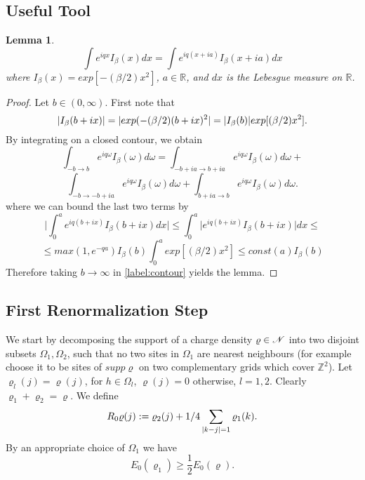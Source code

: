 \documentclass[11pt,reqno]{article}
\DeclarePairedDelimiter\abs{\lvert}{\rvert}%
\newtheorem{lemma}[thm]{Lemma}
\theoremstyle{definition}
\numberwithin{equation}{section}
\begin{document}
\subsection{Useful Tool}
\begin{lemma} \label{lemma:contour}
\begin{equation}
\int e^{i q x} I_\beta(x)dx = \int e^{i q (x+ia)} I_\beta(x+ia)dx
\end{equation}
where $I_\beta(x) = exp[-(\beta/2)x^2]$, $a\in \mathbb{R}$, and $dx$ is the Lebesgue measure on $\mathbb{R}$.
\end{lemma}
\begin{proof}
Let $b \in (0,\infty)$. First note that 
$$
\abs{I_\beta(b+ix)} = \abs{exp(-(\beta/2) (b+ix)^2} = \abs{I_\beta(b)}exp[(\beta/2)x^2].
$$
By integrating on a closed contour, we obtain
$$
\int_{-b \rightarrow b} e^{i q \omega} I_\beta(\omega)d\omega =
\int_{-b+ia \rightarrow b+ia} e^{i q \omega} I_\beta(\omega)d\omega + 
$$
\begin{equation} \label{label:contour}
\int_{-b \rightarrow -b+ia} e^{i q \omega} I_\beta(\omega)d\omega +
\int_{b+ia \rightarrow b} e^{i q \omega} I_\beta(\omega)d\omega.
\end{equation}
where we can bound the last two terms by
$$
\Bigg| \int_0^a e^{iq(b+ix)}I_\beta(b+ix)dx \Bigg| \leq 
\int_0^a \Big| e^{iq(b+ix)}I_\beta(b+ix)\Big| dx \leq
$$
$$
\leq max(1, e^{-qa}) I_\beta(b) \int_0^a exp[(\beta/2)x^2] \leq const(a)I_\beta(b)
$$
Therefore taking $b\rightarrow\infty$ in \eqref{label:contour} yields the lemma.
\end{proof}


\subsection{First Renormalization Step}

We start by decomposing the support of a charge density $\varrho \in \mathscr{N}$ into two disjoint subsets $\Omega_1, \Omega_2$, such that no two sites in $\Omega_1$ are nearest neighbours (for example choose it to be sites of $supp\varrho$ on two complementary grids which cover $\mathbb{Z}^2$). Let $\varrho_l(j) = \varrho(j)$, for $h \in \Omega_l$, $\varrho(j)=0$ otherwise, $l=1,2$. Clearly $\varrho_1 + \varrho_2 = \varrho$. We define
$$
R_0\varrho(j) := \varrho_2(j) + 1/4\sum_{\abs{k-j}=1}\varrho_1(k).
$$
By an appropriate choice of $\Omega_1$ we have
\begin{equation} \label{label:lab419}
E_0(\varrho_1) \geq \frac{1}{2} E_0(\varrho).
\end{equation}
\end{document}
